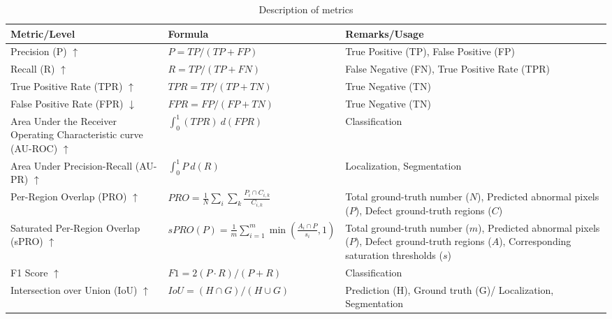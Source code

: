 \begin{table}[htbp]
    \tiny
    \centering
    \begin{tabularx}{\textwidth}{| >{\raggedright\arraybackslash}X| >{\raggedright\arraybackslash}X| >{\raggedright\arraybackslash}X|}%
        \hline
        \textbf{Metric/Level} & \textbf{Formula} & \textbf{Remarks/Usage} \\
        \hline
        Precision (P) $\uparrow$ & $P = TP/(TP + FP)$ & True Positive (TP), False Positive (FP) \\
        \hline
        Recall (R) $\uparrow$ & $R = TP/(TP + FN)$ & False Negative (FN), True Positive Rate (TPR) \\
        \hline
        True Positive Rate (TPR) $\uparrow$ & $TPR = TP/(TP + TN)$ & True Negative (TN) \\
        \hline
        False Positive Rate (FPR) $\downarrow$ & $FPR = FP/(FP + TN)$ & True Negative (TN) \\
        \hline
        Area Under the Receiver Operating Characteristic curve (AU-ROC) $\uparrow$ & $ \int_{0}^{1} (TPR) \: d(FPR)$ & Classification \\
        \hline
        Area Under Precision-Recall (AU-PR) $\uparrow$ & $\int_{0}^{1} P \: d(R)$ & Localization, Segmentation \\
        \hline
        Per-Region Overlap (PRO) $\uparrow$ & $PRO = \frac{1}{N} \sum_{i} \sum_{k} \frac{P_i \cap C_{i,k}}{C_{i,k}}$ & Total ground-truth number (\(N\)), Predicted abnormal pixels (\(P\)), Defect ground-truth regions (\(C\)) \\
        \hline
        Saturated Per-Region Overlap (sPRO) $\uparrow$ & $sPRO(P) = \frac{1}{m} \sum_{i=1}^{m} \min(\frac{A_i \cap P}{s_i}, 1)$ & Total ground-truth number (\(m\)), Predicted abnormal pixels (\(P\)), Defect ground-truth regions (\(A\)), Corresponding saturation thresholds (\(s\)) \\
        \hline
        F1 Score $\uparrow$ & $F1 = 2(P \cdot R)/(P + R)$ & Classification \\
        \hline
        Intersection over Union (IoU) $\uparrow$ & $IoU = (H \cap G)/(H \cup G)$ & Prediction (H), Ground truth (G)/ Localization, Segmentation \\
        \hline
    \end{tabularx}
    \caption{Description of metrics}
    \label{tab:metrics}
\end{table}



